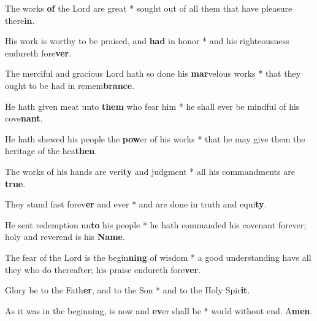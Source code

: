 \begin{multicols}{2}
	The works \textbf{of} the Lord are great * sought out of all them that have pleasure there\textbf{in}.
	
	His work is worthy to be praised, and \textbf{had} in honor * and his righteousness endureth fore\textbf{ver}.
	
	The merciful and gracious Lord hath so done his \textbf{mar}velous works * that they ought to be had in remem\textbf{brance}.
	
	He hath given meat unto \textbf{them} who fear him * he shall ever be mindful of his cove\textbf{nant}.
	
	He hath shewed his people the \textbf{pow}er of his works * that he may give them the heritage of the hea\textbf{then}.
	
	The works of his hands are veri\textbf{ty} and judgment * all his commandments are \textbf{true}.
	
	They stand fast forev\textbf{er} and ever * and are done in truth and equi\textbf{ty}.
	
	He sent redemption un\textbf{to} his people * he hath commanded his covenant forever; holy and reverend is his \textbf{Name}.
	
	The fear of the Lord is the begin\textbf{ning} of wisdom * a good understanding have all they who do thereafter; his praise endureth fore\textbf{ver}.
	
	Glory be to the Fath\textbf{er}, and to the Son * and to the Holy Spir\textbf{it}.
	
	As it was in the beginning, is now and \textbf{ev}er shall be * world without end. A\textbf{men}.
\end{multicols}